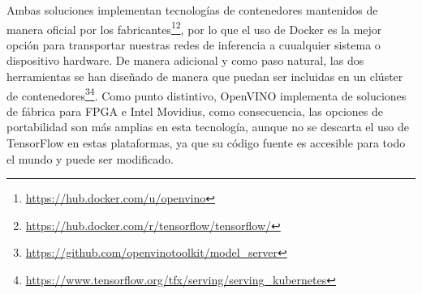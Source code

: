 Ambas soluciones implementan tecnologías de contenedores mantenidos de manera oficial por los fabricantes\footnote{\url{https://hub.docker.com/u/openvino}}\footnote{\url{https://hub.docker.com/r/tensorflow/tensorflow/}}, por lo que el uso de Docker es la mejor opción para transportar
nuestras redes de inferencia a cuualquier sistema o dispositivo hardware.
De manera adicional y como paso natural, las dos herramientas se han diseñado de manera que puedan ser incluidas en un clúster de contenedores\footnote{\url{https://github.com/openvinotoolkit/model_server}}\footnote{\url{https://www.tensorflow.org/tfx/serving/serving_kubernetes}}.
Como punto distintivo, OpenVINO implementa de soluciones de fábrica para FPGA e Intel Movidius, como consecuencia, las opciones de portabilidad son más amplias en esta tecnología, aunque no se descarta el uso de TensorFlow en estas plataformas, ya que su código fuente es accesible para todo el mundo y puede ser modificado.



